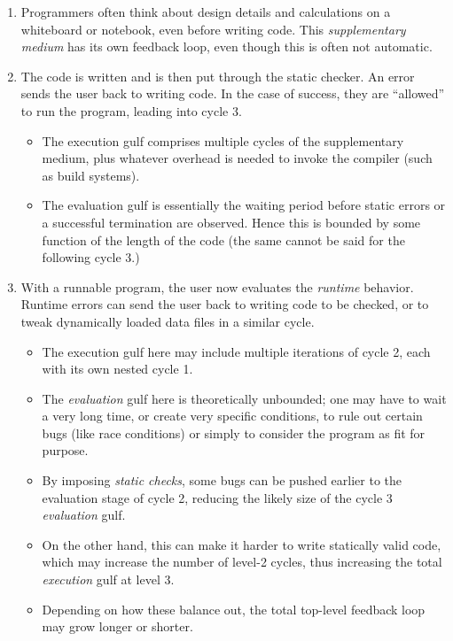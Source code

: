 \documentclass[english,submission]{programming}
\begin{document}
\begin{enumerate}
\def\labelenumi{\arabic{enumi}.}
\item
  Programmers often think about design details and calculations on a
  whiteboard or notebook, even before writing code. This
  \emph{supplementary medium} has its own feedback loop, even though
  this is often not automatic.
\item
  The code is written and is then put through the static checker. An
  error sends the user back to writing code. In the case of success,
  they are ``allowed'' to run the program, leading into cycle 3.

  \begin{itemize}
  \tightlist
  \item
    The execution gulf comprises multiple cycles of the supplementary
    medium, plus whatever overhead is needed to invoke the compiler
    (such as build systems).
  \item
    The evaluation gulf is essentially the waiting period before static
    errors or a successful termination are observed. Hence this is
    bounded by some function of the length of the code (the same cannot
    be said for the following cycle 3.)
  \end{itemize}
\item
  With a runnable program, the user now evaluates the \emph{runtime}
  behavior. Runtime errors can send the user back to writing code to be
  checked, or to tweak dynamically loaded data files in a similar cycle.

  \begin{itemize}
  \tightlist
  \item
    The execution gulf here may include multiple iterations of cycle 2,
    each with its own nested cycle 1.
  \item
    The \emph{evaluation} gulf here is theoretically unbounded; one may
    have to wait a very long time, or create very specific conditions,
    to rule out certain bugs (like race conditions) or simply to
    consider the program as fit for purpose.
  \item
    By imposing \emph{static checks}, some bugs can be pushed earlier to
    the evaluation stage of cycle 2, reducing the likely size of the
    cycle 3 \emph{evaluation} gulf.
  \item
    On the other hand, this can make it harder to write statically valid
    code, which may increase the number of level-2 cycles, thus
    increasing the total \emph{execution} gulf at level 3.
  \item
    Depending on how these balance out, the total top-level feedback
    loop may grow longer or shorter.
  \end{itemize}
\end{enumerate}
\end{document}
